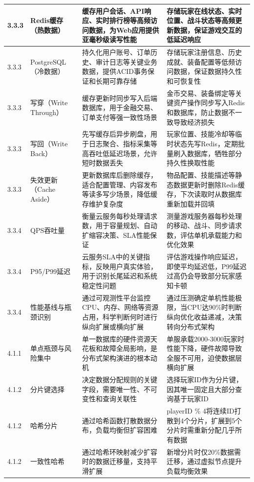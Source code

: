 \begin{longtable}{p{2.5cm}p{3cm}p{4.5cm}p{4.5cm}}
\hline
3.3.3 & Redis缓存（热数据） & 缓存用户会话、API响应、实时排行榜等高频访问数据，为Web应用提供亚毫秒级读写性能 & 存储玩家在线状态、实时位置、战斗状态等高频更新数据，保证游戏交互的低延迟响应 \\
\hline
3.3.3 & PostgreSQL（冷数据） & 持久化用户账号、订单历史、审计日志等关键业务数据，提供ACID事务保证和长期可靠存储 & 存储玩家注册信息、历史成就、装备配置等低频访问数据，保证数据持久性和可恢复性 \\
\hline
3.3.3 & 写穿（Write Through） & 缓存更新时同步写入后端数据库，用于金融交易、订单支付等强一致性场景 & 金币交易、装备绑定等关键资产操作同步写入Redis和数据库，防止数据不一致导致经济损失 \\
\hline
3.3.3 & 写回（Write Back） & 先写缓存后异步刷盘，用于日志聚合、指标采集等高吞吐低延迟场景，允许短时数据丢失 & 玩家位置、技能冷却等临时状态先写Redis，定期批量刷入数据库，牺牲部分持久性换取性能 \\
\hline
3.3.3 & 失效更新（Cache Aside） & 更新数据库后删除缓存，适合配置管理、内容发布等读多写少场景，降低缓存维护复杂度 & 物品配置、技能描述等静态数据更新时删除Redis缓存，下次读取时从数据库重新加载并回填 \\
\hline
3.3.4 & QPS吞吐量 & 衡量云服务每秒处理请求数，用于容量规划、自动扩缩容决策、SLA性能保证 & 测量游戏服务器每秒处理的移动、战斗、同步请求数，评估单机承载能力和优化效果 \\
\hline
3.3.4 & P95/P99延迟 & 云服务SLA中的关键指标，反映用户真实体验，用于识别长尾延迟和系统稳定性问题 & 评估游戏操作响应延迟，即使平均延迟低，P99延迟过高仍会导致部分玩家感知卡顿 \\
\hline
3.3.4 & 性能基线与瓶颈识别 & 通过可观测性平台监控CPU、内存、网络等资源占用，科学判断何时进行纵向扩展或横向扩展 & 通过压测确定单机性能极限，当CPU达90\%时判断纵向优化收益递减，决策转向分布式架构 \\
\hline
4.1.1 & 单点瓶颈与风险集中 & 单一数据库的硬件资源天花板和故障全局影响，是分布式架构演进的根本动机 & 单服承载2000-3000玩家时性能下降，硬件故障导致全服不可用，迫使数据层横向扩展 \\
\hline
4.1.2 & 分片键选择 & 决定数据分配规则的关键字段，需要唯一性、不可变性和查询关联性 & 选择玩家ID作为分片键，因其唯一固定且大部分查询基于玩家ID \\
\hline
4.1.2 & 哈希分片 & 通过哈希函数打散数据分布，负载均衡但扩容困难 & playerID \% 4将连续ID打散到4个分片，扩展到5个分片时需重新分配几乎所有数据 \\
\hline
4.1.2 & 一致性哈希 & 通过哈希环映射减少扩容时的数据迁移量，支持平滑扩展 & 新增分片时仅20\%数据需迁移，通过虚拟节点提升负载均衡效果 \\

\end{longtable}
